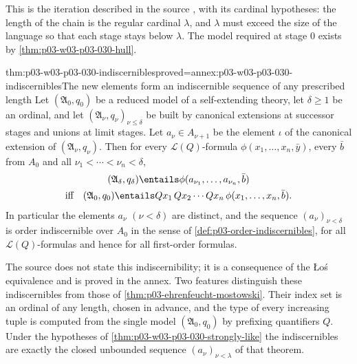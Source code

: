 This is the iteration described in the source
\cite[p.~205]{Schmerl1985TransferTheorems}, with its cardinal hypotheses: the
length of the chain is the regular cardinal \(\lambda\), and \(\lambda\) must
exceed the size of the language so that each stage stays below \(\lambda\).
The model required at stage \(0\) exists by \cref{thm:p03-w03-p03-030-hull}.

\begin{hbtheorem}{thm:p03-w03-p03-030-indiscernibles}{proved=annex:p03-w03-p03-030-indiscernibles}{The new elements form an indiscernible sequence of any prescribed length}
Let \((\mathfrak A_0,q_0)\) be a reduced model of a self-extending theory, let
\(\delta\ge1\) be an ordinal, and let \((\mathfrak A_\nu,q_\nu)_{\nu\le\delta}\)
be built by canonical extensions at successor stages and unions at limit
stages.  Let \(a_\nu\in A_{\nu+1}\) be the element \(\iota\) of the canonical
extension of \((\mathfrak A_\nu,q_\nu)\).  Then for every
\(\mathscr L(Q)\)-formula \(\phi(x_1,\ldots,x_n,\bar y)\), every \(\bar b\)
from \(A_0\) and all \(\nu_1<\cdots<\nu_n<\delta\),
\begin{multline*}
 (\mathfrak A_\delta,q_\delta)\entails
     \phi(a_{\nu_1},\ldots,a_{\nu_n},\bar b)\\
 \text{iff}\quad
 (\mathfrak A_0,q_0)\entails Qx_1\,Qx_2\cdots Qx_n\,\phi(x_1,\ldots,x_n,\bar b).
\end{multline*}
In particular the elements \(a_\nu\) \((\nu<\delta)\) are distinct, and the
sequence \((a_\nu)_{\nu<\delta}\) is order indiscernible over \(A_0\) in the
sense of \cref{def:p03-order-indiscernibles}, for all \(\mathscr L(Q)\)-formulas
and hence for all first-order formulas.
\end{hbtheorem}

The source does not state this indiscernibility; it is a consequence of the
\L o\'s equivalence and is proved in the annex.  Two features distinguish
these indiscernibles from those of \cref{thm:p03-ehrenfeucht-mostowski}.
Their index set is an ordinal of any length, chosen in advance, and the type
of every increasing tuple is computed from the single model
\((\mathfrak A_0,q_0)\) by prefixing quantifiers \(Q\).  Under the
hypotheses of \cref{thm:p03-w03-p03-030-strongly-like} the indiscernibles are
exactly the closed unbounded sequence \((a_\nu)_{\nu<\lambda}\) of that
theorem.

